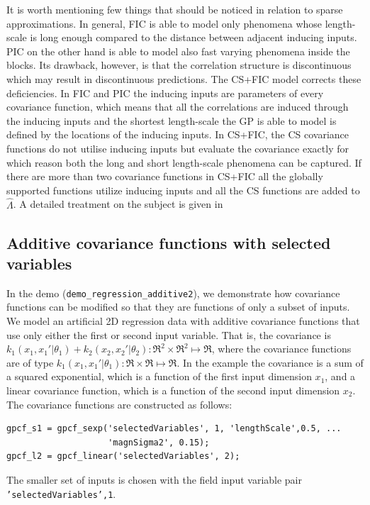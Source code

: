 \documentclass[twoside,11pt]{article}
\newcommand{\code}[1]{{\normalfont\texttt{#1}}}
\begin{document}
It is worth mentioning few things that should be noticed in relation
to sparse approximations. In general, FIC is able to model only
phenomena whose length-scale is long enough compared to the distance
between adjacent inducing inputs.  PIC on the other hand is able to
model also fast varying phenomena inside the blocks. Its drawback,
however, is that the correlation structure is discontinuous which may
result in discontinuous predictions. The CS+FIC model corrects these
deficiencies. In FIC and PIC the inducing inputs are parameters of
every covariance function, which means that all the correlations are
induced through the inducing inputs and the shortest length-scale the
GP is able to model is defined by the locations of the inducing
inputs. In CS+FIC, the CS covariance functions do not utilise inducing
inputs but evaluate the covariance exactly for which reason both the
long and short length-scale phenomena can be captured.  If there are
more than two covariance functions in CS+FIC all the globally
supported functions utilize inducing inputs and all the CS functions
are added to $\hat{\Lambda}$. A detailed treatment on the subject is
given in
\citep[][]{Vanhatalo+Vehtari:2008,Vanhatalo+Vehtari:2010,Vanhatalo+Pietilainen+Vehtari:2010}


\subsection{Additive covariance functions with selected variables}
\label{sec:addit-covar-funct}

In the demo (\code{demo\_regression\_additive2}), we demonstrate how
covariance functions can be modified so that they are functions of
only a subset of inputs. We model an artificial 2D regression data
with additive covariance functions that use only either the first or
second input variable. That is, the covariance is
$k_1(x_1,x_1'|\theta_1) + k_2(x_2,x_2'|\theta_2): \Re^2 \times
\Re^2\mapsto \Re$, where the covariance functions are of type
$k_1(x_1,x_1'|\theta_1): \Re \times \Re \mapsto \Re$. In the example
the covariance is a sum of a squared exponential, which is a function
of the first input dimension $x_1$, and a linear covariance function,
which is a function of the second input dimension $x_2$. The
covariance functions are constructed as follows:
%
\begin{verbatim}
gpcf_s1 = gpcf_sexp('selectedVariables', 1, 'lengthScale',0.5, ...
                    'magnSigma2', 0.15);
gpcf_l2 = gpcf_linear('selectedVariables', 2);
\end{verbatim}
%
The smaller set of inputs is chosen with the field input variable pair
\code{'selectedVariables',1}.
\end{document}
